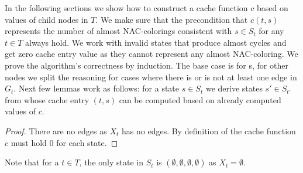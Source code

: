 In the following sections we show how to construct a cache function \( c \)
based on values of child nodes in \( T \).
We make sure that the precondition that \( c(t, s) \) represents the number of almost NAC-colorings
consistent with \( s \in S_t \) for any \( t \in T  \) always hold.
We work with invalid states that produce almost cycles and
get zero cache entry value as they cannot represent any almost NAC-coloring.
We prove the algorithm's correctness by induction.
The base case is for \LeafNode{}s, for other nodes we split the reasoning for cases where
there is or is not at least one edge in \( G_t \).
Next few lemmas work as follows: for a state \( s \in S_t \)
we derive states \( s' \in S_{t'} \) from whose cache entry \( (t, s) \)
can be computed based on already computed values of \( c \).

%
\begin{proof}
	There are no edges as \( X_t \) has no edges.
	By definition of the cache function \( c \) must hold \( 0 \)
	for each \LeafNode{} state.
\end{proof}
%
Note that for a \LeafNode{} \( t \in T \),
the only state in \( S_t \) is \( (\emptyset, \emptyset, \emptyset, \emptyset) \)
as \( X_t = \emptyset \).

